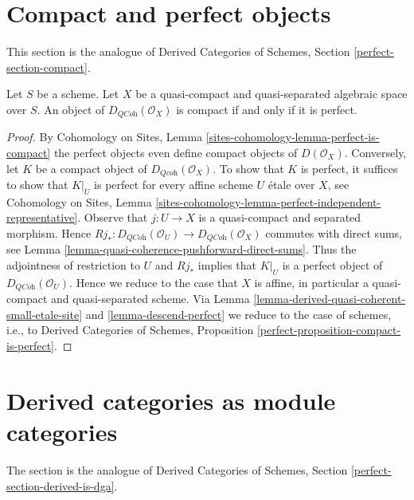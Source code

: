 \section{Compact and perfect objects}
\label{section-compact}

\noindent
This section is the analogue of
Derived Categories of Schemes, Section \ref{perfect-section-compact}.

\begin{proposition}
\label{proposition-compact-is-perfect}
Let $S$ be a scheme.
Let $X$ be a quasi-compact and quasi-separated algebraic space over $S$.
An object of $D_{\textit{QCoh}}(\mathcal{O}_X)$ is compact
if and only if it is perfect.
\end{proposition}

\begin{proof}
By Cohomology on Sites, Lemma \ref{sites-cohomology-lemma-perfect-is-compact}
the perfect objects even define compact objects of $D(\mathcal{O}_X)$.
Conversely, let $K$ be a compact object of $D_{\textit{Qcoh}}(\mathcal{O}_X)$.
To show that $K$ is perfect, it suffices to show that
$K|_U$ is perfect for every affine scheme $U$ \'etale over $X$, see
Cohomology on Sites, Lemma
\ref{sites-cohomology-lemma-perfect-independent-representative}.
Observe that $j : U \to X$ is a quasi-compact and separated morphism.
Hence
$Rj_* : D_{\textit{QCoh}}(\mathcal{O}_U) \to D_{\textit{QCoh}}(\mathcal{O}_X)$
commutes with direct sums, see
Lemma \ref{lemma-quasi-coherence-pushforward-direct-sums}.
Thus the adjointness of restriction to $U$ and $Rj_*$ implies that
$K|_U$ is a perfect object of $D_{\textit{QCoh}}(\mathcal{O}_U)$.
Hence we reduce to the case that $X$ is affine, in particular a
quasi-compact and quasi-separated scheme. Via
Lemma \ref{lemma-derived-quasi-coherent-small-etale-site} and
\ref{lemma-descend-perfect}
we reduce to the case of schemes, i.e., to
Derived Categories of Schemes, Proposition
\ref{perfect-proposition-compact-is-perfect}.
\end{proof}











\section{Derived categories as module categories}
\label{section-derived-is-dga}

\noindent
The section is the analogue of
Derived Categories of Schemes, Section \ref{perfect-section-derived-is-dga}.

